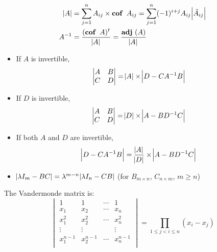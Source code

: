 \begin{example}[determinate]
    \begin{equation*}
    \begin{aligned}
        \determinate{A} &= \sum_{j=1}^n A_{ij} \times \cofactor{A_{ij}} = \sum_{j=1}^n (-1)^{i+j} A_{ij}  \determinate{\tilde{A}_{ij}} \\
        \inverse{A} &= \frac{(\cofactor{A})^t}{\determinate{A}} = \frac{\adjugate{A}}{\determinate{A}}
    \end{aligned}
    \end{equation*}
    
    \begin{itemize}
        \item If $A$ is invertible, \begin{equation}
            \begin{vmatrix}
                A & B \\
                C & D
                \end{vmatrix} = \abs{A} \times \abs{D - C {A}^{-1} B}
        \end{equation}
    \item If $D$ is invertible, \begin{equation}
            \begin{vmatrix}
                A & B \\
                C & D
                \end{vmatrix} = \abs{D} \times \abs{A - B {D}^{-1} C}
        \end{equation}
    \item If both $A$ and $D$ are invertible, \begin{equation}
        \abs{D - C {A}^{-1} B} = \frac{\abs{A}}{\abs{D}} \times \abs{A - B {D}^{-1} C}
        \end{equation}
    \item $\abs{\lambda I_m - BC} =\lambda^{m-n} \abs{\lambda I_n - CB}$ (for $B_{m \times n}$, $C_{n \times m}$, $m \geq n$)
    \end{itemize}
    
    The Vandermonde matrix is:
    \begin{equation}
        \begin{vmatrix}
        1 & 1  & \cdots  & 1  \\
        x_1  & x_2 & \cdots & x_n \\
        x_1^2 & x_2^2 & \cdots & x_n^2 \\
        \vdots & \vdots & & \vdots \\
        x_1^{n-1} & x_2^{n-1} & \cdots & x_n^{n-1} \\
        \end{vmatrix} = \prod_{1 \leq j < i \leq n}(x_i - x_j)
    \end{equation}
\end{example}

